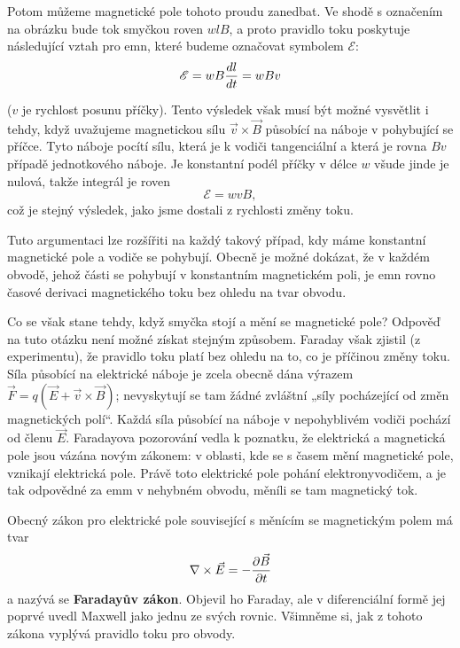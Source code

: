 {  Potom můžeme magnetické pole tohoto proudu zanedbat. Ve shodě s označením na obrázku bude tok 
  smyčkou roven \(wlB\), a proto pravidlo toku poskytuje následující vztah pro emn, které 
  budeme označovat symbolem \(\mathscr{E}\):  
  \begin{equation}\label{fyz:eq376}
    \mathscr{E} = wB\dfrac{d l}{d t} = wBv
  \end{equation}
  
  (\(v\) je rychlost posunu příčky). Tento výsledek však musí být možné vysvětlit i tehdy, když 
  uvažujeme magnetickou sílu \(\vec{v}\times\vec{B}\) působící na náboje v pohybující se příčce. 
  Tyto náboje pocítí sílu, která je k vodiči tangenciální a která je rovna \(Bv\) případě 
  jednotkového náboje. Je konstantní podél příčky v délce \(w\) všude jinde je nulová, takže 
  integrál je roven
  \begin{equation}\label{fyz:eq377}
    \mathscr{E} = wvB,
  \end{equation}
  což je stejný výsledek, jako jsme dostali z rychlosti změny toku.
  
  Tuto argumentaci lze rozšířiti na každý takový případ, kdy máme konstantní magnetické pole a 
  vodiče se pohybují. Obecně je možné dokázat, že v každém obvodě, jehož části se pohybují v 
  konstantním magnetickém poli, je emn rovno časové derivaci magnetického toku bez ohledu na tvar 
  obvodu.
  
  Co se však stane tehdy, když smyčka stojí a mění se magnetické pole? Odpověď na tuto otázku není 
  možné získat stejným způsobem. Faraday však zjistil (z experimentu), že pravidlo toku platí bez 
  ohledu na to, co je příčinou změny toku. Síla působící na elektrické náboje je zcela obecně dána 
  výrazem \(\vec{F}=q(\vec{E}+ \vec{v}\times\vec{B})\); nevyskytují se tam žádné zvláštní „síly 
  pocházející od změn magnetických polí“. Každá síla působící na náboje v nepohyblivém vodiči 
  pochází od členu \(\vec{E}\). Faradayova pozorování vedla k poznatku, že elektrická a magnetická 
  pole jsou vázána novým zákonem: v oblasti, kde se s časem mění magnetické pole, vznikají 
  elektrická pole. Právě toto elektrické pole pohání elektronyvodičem, a je tak odpovědné za emm v 
  nehybném obvodu, měníli se tam magnetický tok.
  
  Obecný zákon pro elektrické pole související s měnícím se magnetickým polem má tvar
  \begin{equation}\label{fyz:eq378}
    \nabla\times\vec{E} = -\dfrac{\partial \vec{B}}{\partial t}
  \end{equation}
  a nazývá se \textbf{Faradayův zákon}. Objevil ho Faraday, ale v diferenciální formě jej poprvé 
  uvedl Maxwell jako jednu ze svých rovnic. Všimněme si, jak z tohoto zákona vyplývá pravidlo toku 
  pro obvody. 
  
}
